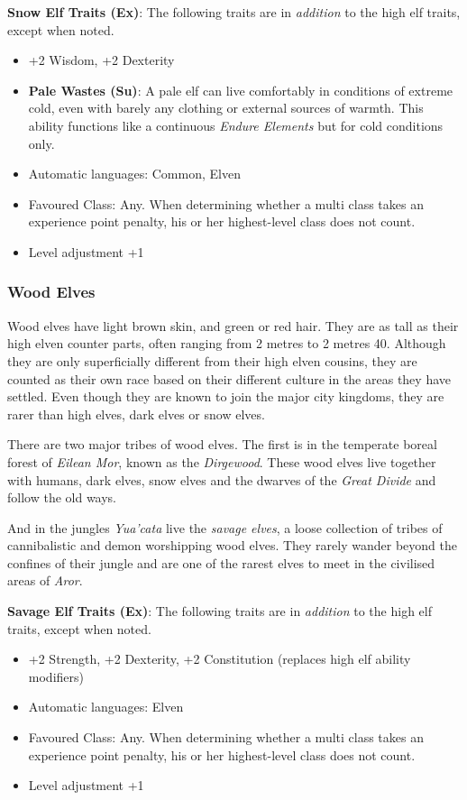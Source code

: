 \begin{35e}
  \textbf{Snow Elf Traits (Ex)}: The following traits are in \emph{addition}
  to the high elf traits, except when noted.
  \begin{itemize}[noitemsep]
    \item +2 Wisdom, +2 Dexterity
    \item \textbf{Pale Wastes (Su)}: A pale elf can live comfortably in
    conditions of extreme cold, even with barely any clothing or external
    sources of warmth. This ability functions like a continuous \emph{Endure
    Elements} but for cold conditions only.
    \item Automatic languages: Common, Elven
    \item Favoured Class: Any. When determining whether a multi class takes an
    experience point penalty, his or her highest-level class does not count.
    \item Level adjustment +1
  \end{itemize}
\end{35e}

\subsubsection*{Wood Elves}

Wood elves have light brown skin, and green or red hair. They are as tall as
their high elven counter parts, often ranging from 2 metres to 2 metres
40. Although they are only superficially different from their high elven
cousins, they are counted as their own race based on their different culture
in the areas they have settled. Even though they are known to join the major
city kingdoms, they are rarer than high elves, dark elves or snow elves.

There are two major tribes of wood elves. The first is in the temperate boreal
forest of \emph{Eilean Mor}, known as the \emph{Dirgewood}. These wood elves
live together with humans, dark elves, snow elves and the dwarves of the
\emph{Great Divide} and follow the old ways.

And in the jungles \emph{Yua'cata} live the \emph{savage elves}, a loose
collection of tribes of cannibalistic and demon worshipping wood elves. They
rarely wander beyond the confines of their jungle and are one of the rarest
elves to meet in the civilised areas of \emph{Aror}.

\begin{35e}
  \textbf{Savage Elf Traits (Ex)}: The following traits are in \emph{addition}
  to the high elf traits, except when noted.
  \begin{itemize}[noitemsep]
    \item +2 Strength, +2 Dexterity, +2 Constitution (replaces high elf ability
    modifiers)
    \item Automatic languages: Elven
    \item Favoured Class: Any. When determining whether a multi class takes an
    experience point penalty, his or her highest-level class does not count.
    \item Level adjustment +1
  \end{itemize}
\end{35e}

